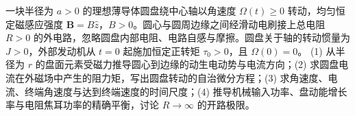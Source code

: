 一块半径为 \(a>0\) 的理想薄导体圆盘绕中心轴以角速度 \(\Omega(t)\ge0\) 转动，均匀恒定磁感应强度 \(\boldsymbol B=B\hat z\)，\(B>0\)。圆心与圆周边缘之间经滑动电刷接上总电阻 \(R>0\) 的外电路，忽略圆盘内部电阻、电路自感与摩擦。圆盘关于轴的转动惯量为 \(J>0\)，外部发动机从 \(t=0\) 起施加恒定正转矩 \(\tau_0>0\)，且 \(\Omega(0)=0\)。
(1) 从半径为 \(r\) 的盘面元素受磁力推导圆心到边缘的动生电动势与电流方向；(2) 求圆盘电流在外磁场中产生的阻力矩，写出圆盘转动的自治微分方程；(3) 求角速度、电流、终端角速度与达到终端速度的时间尺度；(4) 推导机械输入功率、盘动能增长率与电阻焦耳功率的精确平衡，讨论 \(R\to\infty\) 的开路极限。

